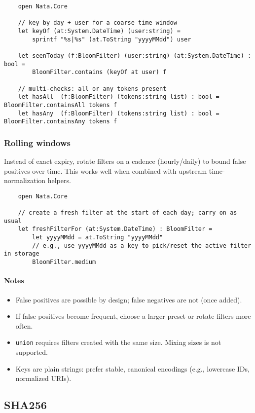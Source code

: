 \documentclass{article}
\begin{document}
\begin{verbatim}
    open Nata.Core

    // key by day + user for a coarse time window
    let keyOf (at:System.DateTime) (user:string) =
        sprintf "%s|%s" (at.ToString "yyyyMMdd") user

    let seenToday (f:BloomFilter) (user:string) (at:System.DateTime) : bool =
        BloomFilter.contains (keyOf at user) f

    // multi-checks: all or any tokens present
    let hasAll  (f:BloomFilter) (tokens:string list) : bool = BloomFilter.containsAll tokens f
    let hasAny  (f:BloomFilter) (tokens:string list) : bool = BloomFilter.containsAny tokens f
\end{verbatim}

\subsubsection{Rolling windows}
Instead of exact expiry, rotate filters on a cadence (hourly/daily) to bound false positives over time. This works well when combined with upstream time-normalization helpers.

\begin{verbatim}
    open Nata.Core

    // create a fresh filter at the start of each day; carry on as usual
    let freshFilterFor (at:System.DateTime) : BloomFilter =
        let yyyyMMdd = at.ToString "yyyyMMdd"
        // e.g., use yyyyMMdd as a key to pick/reset the active filter in storage
        BloomFilter.medium
\end{verbatim}

\paragraph{Notes}
\begin{itemize}
  \item False positives are possible by design; false negatives are not (once added).
  \item If false positives become frequent, choose a larger preset or rotate filters more often.
  \item \texttt{union} requires filters created with the same size. Mixing sizes is not supported.
  \item Keys are plain strings: prefer stable, canonical encodings (e.g., lowercase IDs, normalized URIs).
\end{itemize}

\subsection{SHA256}


\clearpage
\appendix
\end{document}
